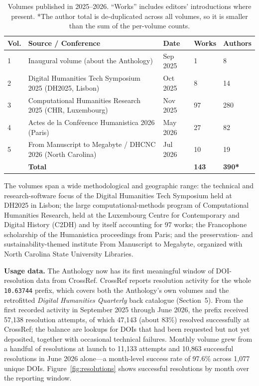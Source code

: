 \documentclass[11pt]{article}
\begin{document}
\begin{table}[h]
\centering
\small
\begin{tabular}{p{0.7cm} p{7.7cm} p{1.4cm} p{1.2cm} p{1.4cm}}
\hline
\textbf{Vol.} & \textbf{Source / Conference} & \textbf{Date} & \textbf{Works} & \textbf{Authors} \\
\hline
1 & Inaugural volume (about the Anthology) & Sep 2025 & 1 & 8 \\
2 & Digital Humanities Tech Symposium 2025 (DH2025, Lisbon) & Oct 2025 & 8 & 14 \\
3 & Computational Humanities Research 2025 (CHR, Luxembourg) & Nov 2025 & 97 & 280 \\
4 & Actes de la Conf\'erence Humanistica 2026 (Paris) & May 2026 & 27 & 82 \\
5 & From Manuscript to Megabyte / DHCNC 2026 (North Carolina) & Jul 2026 & 10 & 19 \\
\hline
& \textbf{Total} & & \textbf{143} & \textbf{390*} \\
\hline
\end{tabular}
\caption{Volumes published in 2025--2026. ``Works'' includes editors' introductions where present. *The author total is de-duplicated across all volumes, so it is smaller than the sum of the per-volume counts.}
\label{tab:vols}
\end{table}

The volumes span a wide methodological and geographic range: the technical and research-software focus of the Digital Humanities Tech Symposium held at DH2025 in Lisbon; the large computational-methods program of Computational Humanities Research, held at the Luxembourg Centre for Contemporary and Digital History (C2DH) and by itself accounting for 97 works; the Francophone scholarship of the Humanistica proceedings from Paris; and the preservation- and sustainability-themed institute From Manuscript to Megabyte, organized with North Carolina State University Libraries.

\textbf{Usage data.} The Anthology now has its first meaningful window of DOI-resolution data from CrossRef. CrossRef reports resolution activity for the whole \texttt{10.63744} prefix, which covers both the Anthology's own volumes and the retrofitted \textit{Digital Humanities Quarterly} back catalogue (Section~5). From the first recorded activity in September 2025 through June 2026, the prefix received 57{,}138 resolution attempts, of which 47{,}143 (about 83\%) resolved successfully at CrossRef; the balance are lookups for DOIs that had been requested but not yet deposited, together with occasional technical failures. Monthly volume grew from a handful of resolutions at launch to 11{,}133 attempts and 10{,}863 successful resolutions in June 2026 alone---a month-level success rate of 97.6\% across 1{,}077 unique DOIs. Figure~\ref{fig:resolutions} shows successful resolutions by month over the reporting window.
\end{document}
